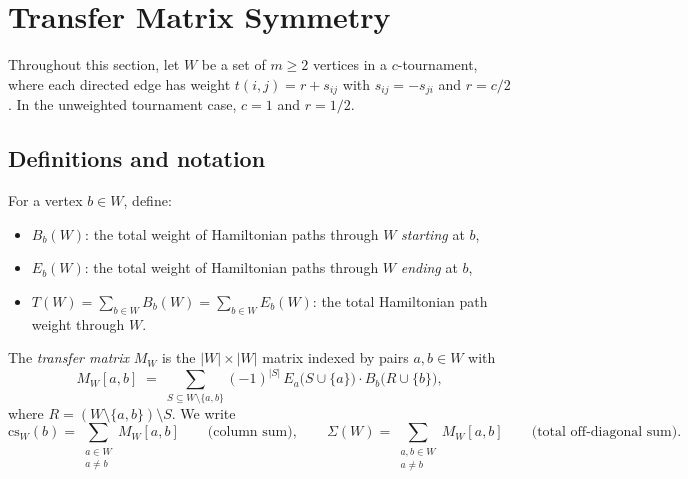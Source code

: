 
\section{Transfer Matrix Symmetry}
\label{sec:transfer}

Throughout this section, let $W$ be a set of $m \geq 2$ vertices in a
$c$-tournament, where each directed edge has weight
$t(i,j) = r + s_{ij}$ with $s_{ij} = -s_{ji}$ and $r = c/2$.
In the unweighted tournament case, $c = 1$ and $r = 1/2$.

\subsection{Definitions and notation}

\begin{definition}\label{def:path-weights}
For a vertex $b \in W$, define:
\begin{itemize}[leftmargin=2em]
  \item $B_b(W)$: the total weight of Hamiltonian paths through $W$
    \emph{starting} at $b$,
  \item $E_b(W)$: the total weight of Hamiltonian paths through $W$
    \emph{ending} at $b$,
  \item $T(W) = \sum_{b \in W} B_b(W) = \sum_{b \in W} E_b(W)$:
    the total Hamiltonian path weight through $W$.
\end{itemize}
\end{definition}

\begin{definition}\label{def:transfer-matrix}
The \emph{transfer matrix} $M_W$ is the $|W| \times |W|$ matrix indexed
by pairs $a, b \in W$ with
\[
  M_W[a,b] \;=\; \sum_{S \subseteq W \setminus \{a,b\}}
    (-1)^{|S|}\, E_a\!\bigl(S \cup \{a\}\bigr)\cdot
    B_b\!\bigl(R \cup \{b\}\bigr),
\]
where $R = (W \setminus \{a,b\}) \setminus S$.
We write
\[
  \mathrm{cs}_W(b) = \sum_{\substack{a \in W \\ a \neq b}} M_W[a,b]
  \qquad\text{(column sum)},
  \qquad
  \Sigma(W) = \sum_{\substack{a,b \in W \\ a \neq b}} M_W[a,b]
  \qquad\text{(total off-diagonal sum)}.
\]
\end{definition}

